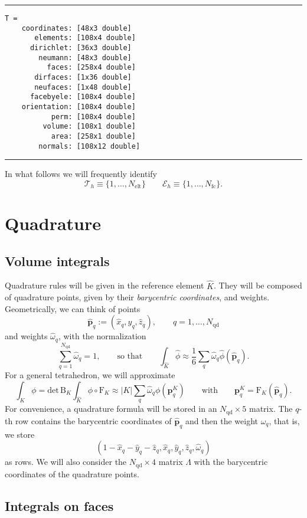 \documentclass[10pt,english]{article}
\newcommand{\smallfrac}[2]{{\textstyle\frac{#1}{#2}}}
\newcommand{\oneline}{\vspace{0.4cm}\hrule\vspace{0.4cm}}
\newcommand{\Nelt}{{N_{\mathrm{elt}}}}
\newcommand{\Nnd}{{N_{\mathrm{qd}}}}
\newcommand{\Nfc}{{N_{\mathrm{fc}}}}
\begin{document}
\oneline
\begin{verbatim}
T = 
    coordinates: [48x3 double]
       elements: [108x4 double]
      dirichlet: [36x3 double]
        neumann: [48x3 double]
          faces: [258x4 double]
       dirfaces: [1x36 double]
       neufaces: [1x48 double]
      facebyele: [108x4 double]
    orientation: [108x4 double]
           perm: [108x4 double]
         volume: [108x1 double]
           area: [258x1 double]
        normals: [108x12 double]
\end{verbatim}
\oneline

In what follows we will frequently identify
\[
\mathcal T_h \equiv \{1,\ldots,\Nelt\} \qquad \mathcal E_h\equiv \{1,\ldots,\Nfc\}.
\]


\section{Quadrature}

\subsection{Volume integrals}\label{sec:2.1}

Quadrature rules will be given in the reference element $\widehat K$. They will be composed of quadrature points, given by their {\em barycentric coordinates}, and weights. Geometrically, we can think of points
\[
\widehat{\mathbf p}_q:=(\widehat x_q,\widehat y_q,\widehat z_q), \qquad q=1,\ldots,\Nnd
\]
and weights $\widehat\omega_q$, with the normalization
\[
\sum_{q=1}^\Nnd \widehat\omega_q=1,
\qquad\mbox{so that}\qquad
\int_{\widehat K} \widehat\phi \approx\smallfrac16 \sum_q \widehat\omega_q \widehat\phi(\widehat{\mathbf p}_q).
\]
For a general tetrahedron, we will approximate
\[
\int_K \phi=\mathrm{det}\,\mathrm B_K\int_{\widehat K} \phi\circ\mathrm F_K \approx |K| \sum_q \widehat\omega_q \phi(\mathbf p_q^K)\qquad \mbox{with}\qquad\mathbf p_q^K =\mathrm F_K(\widehat{\mathbf p}_q).
\]
For convenience, a quadrature formula will be stored in an $\Nnd\times 5$ matrix. The $q$-th row contains the barycentric coordinates of $\widehat{\mathbf p}_q$ and then the weight $\widehat\omega_q$, that is, we store
\[
(1-\widehat x_q-\widehat y_q-\widehat z_q,\widehat x_q,\widehat y_q,\widehat z_q,\widehat\omega_q)
\]
as rows. We will also consider the $\Nnd\times 4$ matrix $\Lambda$ with the barycentric coordinates of the quadrature points.

\subsection{Integrals on faces}
\end{document}
